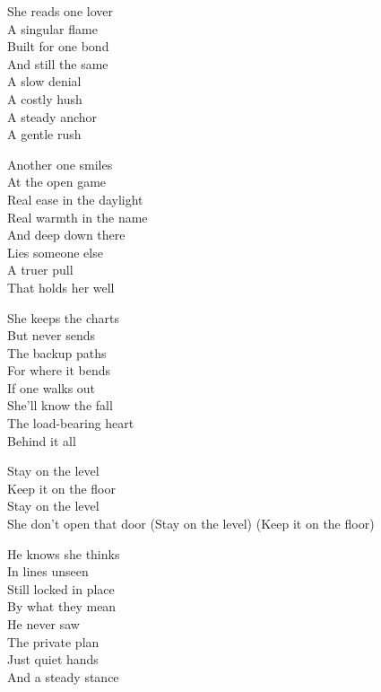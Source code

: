 \begin{lyrics}
She reads one lover\\
A singular flame\\
Built for one bond\\
And still the same\\
A slow denial\\
A costly hush\\
A steady anchor\\
A gentle rush

Another one smiles\\
At the open game\\
Real ease in the daylight\\
Real warmth in the name\\
And deep down there\\
Lies someone else\\
A truer pull\\
That holds her well

She keeps the charts\\
But never sends\\
The backup paths\\
For where it bends\\
If one walks out\\
She'll know the fall\\
The load-bearing heart\\
Behind it all

Stay on the level\\
Keep it on the floor\\
Stay on the level\\
She don't open that door
(Stay on the level)
(Keep it on the floor)

He knows she thinks\\
In lines unseen\\
Still locked in place\\
By what they mean\\
He never saw\\
The private plan\\
Just quiet hands\\
And a steady stance
\end{lyrics}

